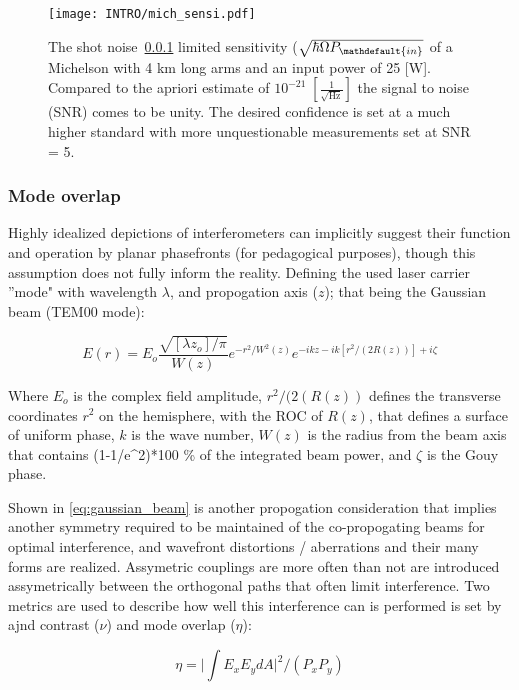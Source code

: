 \begin{figure}[ht!]
	\centering
	\texttt{[image: INTRO/mich\_sensi.pdf]}
	\caption{The shot noise~\ref{} limited sensitivity ($\sqrt{\hbar \Omega P_\mathdefault{in}}$ of a Michelson with 4 km long arms and an input power of 25 [W]. Compared to the apriori estimate of $10^{-21} \; [\frac{1}{\sqrt{\mathrm{Hz}}}]$ the signal to noise (SNR) comes to be unity. The desired confidence is set at a much higher standard with more unquestionable measurements set at SNR = 5.}
	\label{fig:michsensitivity}
\end{figure}

\subsubsection{Mode overlap}
Highly idealized depictions of interferometers can implicitly suggest their function and operation by planar phasefronts (for pedagogical purposes), though this assumption does not fully inform the reality. Defining the used laser carrier ''mode" with wavelength $\lambda$, and propogation axis ($z$); that being the Gaussian beam (TEM00 mode):

\begin{equation}\label{eq:gaussian_beam}
E(r) = E_o \frac{\sqrt{[\lambda z_o] / \pi}}{W(z)}e^{-r^2 / W^2(z)} e^{-ikz - ik[r^2 / (2R(z))] + i \zeta}
\end{equation}

Where $E_o$ is the complex field amplitude, $r^2/(2(R(z))$ defines the transverse coordinates $r^2$ on the hemisphere, with the ROC of $R(z)$, that defines a surface of uniform phase, $k$ is the wave number, $W(z)$ is the radius from the beam axis that contains (1-1/e^2)*100 \% of the integrated beam power, and $\zeta$ is the Gouy phase.

Shown in \ref{eq:gaussian_beam} is another propogation consideration that implies another symmetry required to be maintained of the co-propogating beams for optimal interference, and wavefront distortions / aberrations and their many forms are realized. Assymetric couplings are more often than not are introduced assymetrically between the orthogonal paths that often limit interference. Two metrics are used to describe how well this interference can is performed is set by ajnd contrast ($\nu$) and mode overlap ($\eta$): 

\begin{equation}\label{eq:mode_overlap}
	\eta = \bigg|\int E_x E_y dA \bigg|^{2} \bigg/ (P_x P_y)
\end{equation}

